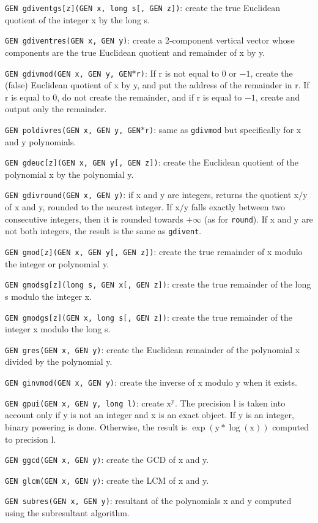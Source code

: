 {\tt GEN gdiventgs[z](GEN x, long s[, GEN z])}: create the true Euclidean 
quotient of the integer x by the long s.

{\tt GEN gdiventres(GEN x, GEN y)}: create a 2-component vertical vector whose
components are the true Euclidean quotient and remainder of x by y.

{\tt GEN gdivmod(GEN x, GEN y, GEN$*$r)}: If r is not equal to 0 or $-1$,
create the (false) Euclidean quotient of x by y, and put the address of the 
remainder in r. If r is equal to 0, do not create the remainder, and if r is
equal to $-1$, create and output only the remainder.

{\tt GEN poldivres(GEN x, GEN y, GEN$*$r)}: same as {\tt gdivmod} but
specifically for x and y polynomials.

{\tt GEN gdeuc[z](GEN x, GEN y[, GEN z])}: create the Euclidean quotient of 
the polynomial x by the polynomial y.

{\tt GEN gdivround(GEN x, GEN y)}: if x and y are integers, returns the
quotient x$/$y of x and y, rounded to the nearest integer. If x$/$y falls
exactly between two consecutive integers, then it is rounded towards
$+\infty$ (as for {\tt round}). If x and y are not both integers, the
result is the same as {\tt gdivent}.

{\tt GEN gmod[z](GEN x, GEN y[, GEN z])}: create the true remainder of x 
modulo the integer or polynomial y.

{\tt GEN gmodsg[z](long s, GEN x[, GEN z])}: create the true remainder of the
long s modulo the integer x.

{\tt GEN gmodgs[z](GEN x, long s[, GEN z])}: create the true remainder of the 
integer x modulo the long s.

{\tt GEN gres(GEN x, GEN y)}: create the Euclidean remainder of the polynomial
x divided by the polynomial y.

{\tt GEN ginvmod(GEN x, GEN y)}: create the inverse of x modulo y when it
exists.

{\tt GEN gpui(GEN x, GEN y, long l)}: create $\text{x}^{\text{y}}$. The
precision l is taken into account only if y is not an integer and x is an
exact object. If y is an integer, binary powering is done. Otherwise, the
result is $\exp(\text{y}*\log(\text{x}))$ computed to precision l.

{\tt GEN ggcd(GEN x, GEN y)}: create the GCD of x and y.

{\tt GEN glcm(GEN x, GEN y)}: create the LCM of x and y.

{\tt GEN subres(GEN x, GEN y)}: resultant of the polynomials x and y computed
using the subresultant algorithm.

